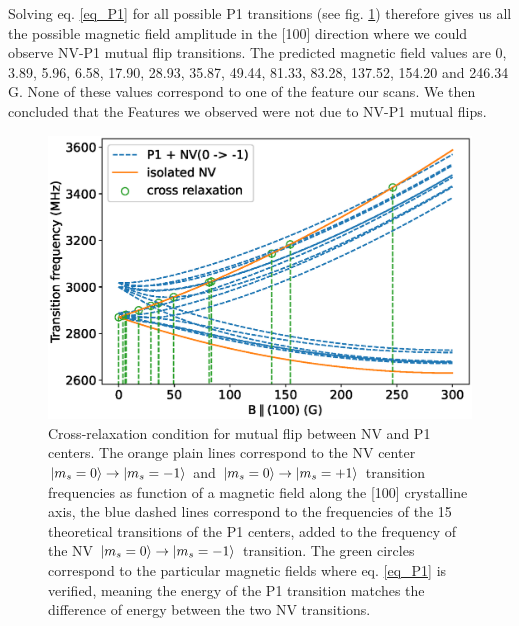 \documentclass{article}
\begin{document}
Solving eq. \ref{eq_P1} for all possible P1 transitions (see fig. \ref{fig_P1}) therefore gives us all the possible magnetic field amplitude in the [100] direction where we could observe NV-P1 mutual flip transitions. The predicted magnetic field values are 0, 3.89, 5.96, 6.58, 17.90, 28.93, 35.87, 49.44, 81.33, 83.28, 137.52, 154.20 and 246.34 G. None of these values correspond to one of the feature our scans. We then concluded that the Features we observed were not due to NV-P1 mutual flips. 
\begin{figure}
\label{fig_P1}
\includegraphics[scale=.6]{Transis_P1}
\caption{Cross-relaxation condition for mutual flip between NV and P1 centers. The orange plain lines correspond to the NV center $\ket{m_s=0} \to \ket{m_s=-1}$ and $\ket{m_s=0} \to \ket{m_s=+1}$ transition frequencies as function of a magnetic field along the [100] crystalline axis, the blue dashed lines correspond to the frequencies of the 15 theoretical transitions of the P1 centers, added to the frequency of the NV $\ket{m_s=0} \to \ket{m_s=-1}$ transition. The green circles correspond to the particular magnetic fields where eq. \ref{eq_P1} is verified, meaning the energy of the P1 transition matches the difference of energy between the two NV transitions.}
\end{figure}



\end{document}
